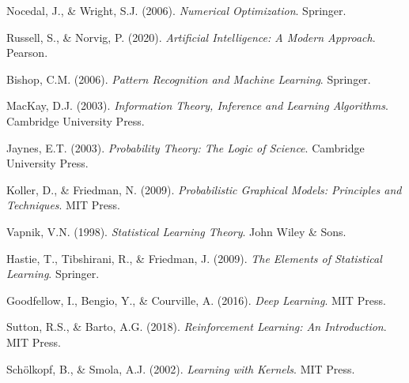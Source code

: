 \documentclass[12pt,a4paper]{article}
\begin{document}
\begin{thebibliography}{99}
Nocedal, J., \& Wright, S.J. (2006). \textit{Numerical Optimization}. Springer.

Russell, S., \& Norvig, P. (2020). \textit{Artificial Intelligence: A Modern Approach}. Pearson.

Bishop, C.M. (2006). \textit{Pattern Recognition and Machine Learning}. Springer.

MacKay, D.J. (2003). \textit{Information Theory, Inference and Learning Algorithms}. Cambridge University Press.

Jaynes, E.T. (2003). \textit{Probability Theory: The Logic of Science}. Cambridge University Press.

Koller, D., \& Friedman, N. (2009). \textit{Probabilistic Graphical Models: Principles and Techniques}. MIT Press.

Vapnik, V.N. (1998). \textit{Statistical Learning Theory}. John Wiley \& Sons.

Hastie, T., Tibshirani, R., \& Friedman, J. (2009). \textit{The Elements of Statistical Learning}. Springer.

Goodfellow, I., Bengio, Y., \& Courville, A. (2016). \textit{Deep Learning}. MIT Press.

Sutton, R.S., \& Barto, A.G. (2018). \textit{Reinforcement Learning: An Introduction}. MIT Press.

Schölkopf, B., \& Smola, A.J. (2002). \textit{Learning with Kernels}. MIT Press.

\end{thebibliography}
\end{document}
